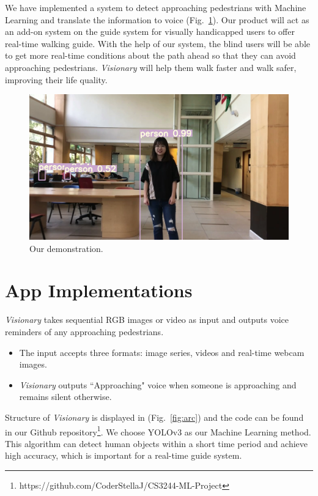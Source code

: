 \documentclass[letterpaper]{article} %
\begin{document}
\noindent We have implemented a system to detect approaching pedestrians with Machine Learning and translate the information to voice (Fig.~\ref{fig:demo}). Our product will act as an add-on system on the guide system for visually handicapped users to offer real-time walking guide. With the help of our system, the blind users will be able to get more real-time conditions about the path ahead so that they can avoid approaching pedestrians. \textit{Visionary} will help them walk faster and walk safer, improving their life quality.
\begin{figure}[ht]
\hspace{0mm}
\centering
\includegraphics[width=0.85\linewidth,height = 0.5\linewidth]{Figure/demo1.png}
\caption{\footnotesize{Our demonstration.}}
\label{fig:demo}
\vspace{-5mm}
\end{figure}
\section{App Implementations}
\textit{Visionary} takes sequential RGB images or video as input and outputs voice reminders of any approaching pedestrians.
\begin{itemize}
\item The input accepts three formats: image series, videos and real-time webcam images.
\item \textit{Visionary} outputs ``Approaching" voice when someone is approaching and remains silent otherwise.
\end{itemize}

\noindent Structure of \textit{Visionary} is displayed in (Fig.~\ref{fig:arc}) and the code can be found in our Github repository\footnote{https://github.com/CoderStellaJ/CS3244-ML-Project}. We choose YOLOv3 as our Machine Learning method. This algorithm can detect human objects within a short time period and achieve high accuracy, which is important for a real-time guide system. \\
\end{document}
